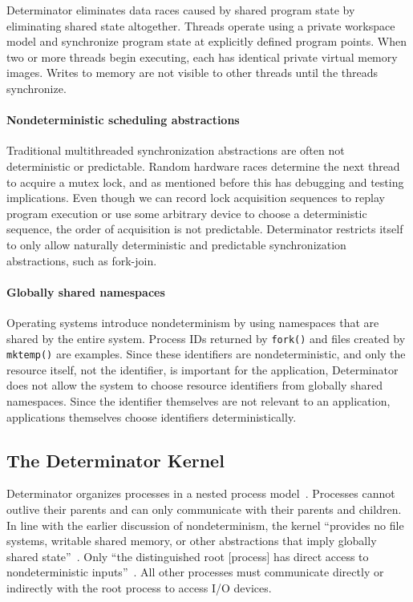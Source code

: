 Determinator eliminates data races caused by shared program state by eliminating
shared state altogether. Threads operate using a private workspace model and
synchronize program state at explicitly defined program points. When two or more
threads begin executing, each has identical private virtual memory images.
Writes to memory are not visible to other threads until the threads synchronize.

\paragraph{Nondeterministic scheduling abstractions}
Traditional multithreaded synchronization abstractions are often not
deterministic or predictable. Random hardware races determine the next thread to
acquire a mutex lock, and as mentioned before this has debugging and testing
implications. Even though we can record lock acquisition sequences to replay
program execution or use some arbitrary device to choose a deterministic
sequence, the order of acquisition is not predictable. Determinator restricts
itself to only allow naturally deterministic and predictable synchronization
abstractions, such as fork-join.

\paragraph{Globally shared namespaces}
Operating systems introduce nondeterminism by using namespaces that are shared
by the entire system. Process IDs returned by {\tt fork()} and files created
by {\tt mktemp()} are examples. Since these identifiers are nondeterministic,
and only the resource itself, not the identifier, is important for the
application, Determinator does not allow the system to choose resource
identifiers from globally shared namespaces. Since the identifier themselves
are not relevant to an application, applications themselves choose identifiers
deterministically.

\subsection{The Determinator Kernel}

Determinator organizes processes in a nested process model~\cite{Ford96}.
Processes cannot outlive their parents and can only communicate with their
parents and children. In line with the earlier discussion of nondeterminism,
the kernel ``provides no file systems, writable shared memory, or other
abstractions that imply globally shared state''~\cite{Aviram10}. Only ``the
distinguished root [process] has direct access to nondeterministic
inputs''~\cite{Aviram10}. All other processes must communicate directly or
indirectly with the root process to access I/O devices.

